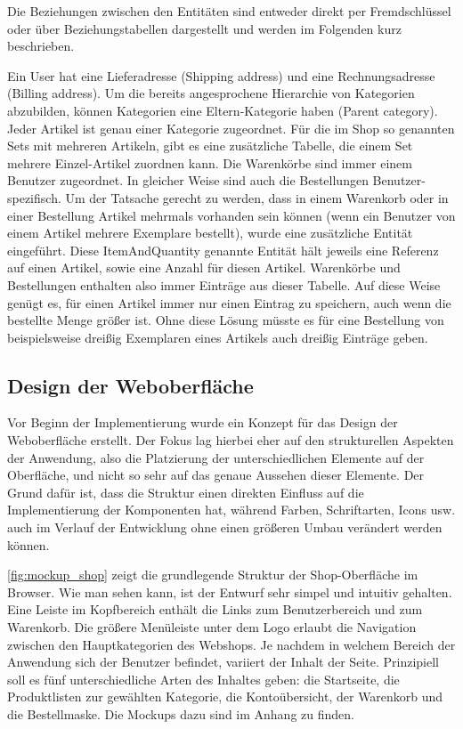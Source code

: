 Die Beziehungen zwischen den Entitäten sind entweder direkt per Fremdschlüssel oder über Beziehungstabellen dargestellt und werden im Folgenden kurz beschrieben.

Ein User hat eine Lieferadresse (Shipping address) und eine Rechnungsadresse (Billing address).
Um die bereits angesprochene Hierarchie von Kategorien abzubilden, können Kategorien eine Eltern-Kategorie haben (Parent category).
Jeder Artikel ist genau einer Kategorie zugeordnet. Für die im Shop so genannten Sets mit mehreren Artikeln, gibt es eine zusätzliche Tabelle, die einem Set mehrere Einzel-Artikel zuordnen kann.
Die Warenkörbe sind immer einem Benutzer zugeordnet. In gleicher Weise sind auch die Bestellungen Benutzer-spezifisch.
Um der Tatsache gerecht zu werden, dass in einem Warenkorb oder in einer Bestellung Artikel mehrmals vorhanden sein können (wenn ein Benutzer von einem Artikel mehrere Exemplare bestellt), wurde eine zusätzliche Entität eingeführt.
Diese ItemAndQuantity genannte Entität hält jeweils eine Referenz auf einen Artikel, sowie eine Anzahl für diesen Artikel.
Warenkörbe und Bestellungen enthalten also immer Einträge aus dieser Tabelle.
Auf diese Weise genügt es, für einen Artikel immer nur einen Eintrag zu speichern, auch wenn die bestellte Menge größer ist.
Ohne diese Lösung müsste es für eine Bestellung von beispielsweise dreißig Exemplaren eines Artikels auch dreißig Einträge geben.

\subsection{Design der Weboberfläche}
Vor Beginn der Implementierung wurde ein Konzept für das Design der Weboberfläche erstellt.
Der Fokus lag hierbei eher auf den strukturellen Aspekten der Anwendung, also die Platzierung der unterschiedlichen Elemente auf der Oberfläche, und nicht so sehr auf das genaue Aussehen dieser Elemente.
Der Grund dafür ist, dass die Struktur einen direkten Einfluss auf die Implementierung der Komponenten hat, während Farben, Schriftarten, Icons usw. auch im Verlauf der Entwicklung ohne einen größeren Umbau verändert werden können.

\cref{fig:mockup_shop} zeigt die grundlegende Struktur der Shop-Oberfläche im Browser.
Wie man sehen kann, ist der Entwurf sehr simpel und intuitiv gehalten. Eine Leiste im Kopfbereich enthält die Links zum Benutzerbereich und zum Warenkorb.
Die größere Menüleiste unter dem Logo erlaubt die Navigation zwischen den Hauptkategorien des Webshops.
Je nachdem in welchem Bereich der Anwendung sich der Benutzer befindet, variiert der Inhalt der Seite.
Prinzipiell soll es fünf unterschiedliche Arten des Inhaltes geben: die Startseite, die Produktlisten zur gewählten Kategorie, die Kontoübersicht, der Warenkorb und die Bestellmaske.
Die Mockups dazu sind im Anhang zu finden. %

